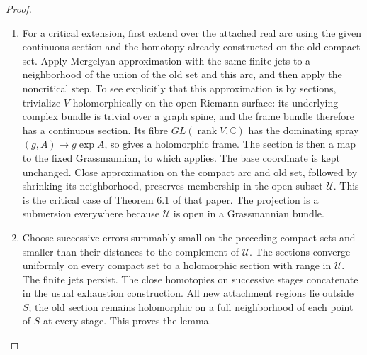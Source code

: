 \begin{proof}
\begin{enumerate}[label={$\langle1\rangle$\arabic*.}]
\item For a critical extension, first extend over the attached real
arc using the given continuous section and the homotopy already
constructed on the old compact set.  Apply Mergelyan
approximation with the same finite jets to a neighborhood of
the union of the old set and this arc, and then apply the
noncritical step.  To see explicitly that this approximation
is by sections, trivialize $V$ holomorphically on the open
Riemann surface: its underlying complex bundle is trivial over
a graph spine, and the frame bundle therefore has a continuous
section.  Its fibre $GL(\operatorname{rank}V,\mathbb C)$ has
the dominating spray $(g,A)\mapsto g\exp A$, so
\cite[Theorem 1.2, preprint p.~3]{ffForstnericPrezelj02} gives a holomorphic
frame.  The section is then a map to the
fixed Grassmannian, to which
\cite[Theorem 2.13, p.~9]{IVVOkaOneV5} applies.  The base
coordinate is kept unchanged.  Close approximation on the
compact arc and old set, followed by shrinking its
neighborhood, preserves membership in the open subset
$\mathscr U$.  This is the critical case of Theorem 6.1 of that paper. The
projection is a submersion everywhere because $\mathscr U$ is
open in a Grassmannian bundle.

\item Choose successive errors summably small on the preceding
compact sets and smaller than their distances to the complement
of $\mathscr U$.  The sections converge uniformly on every
compact set to a holomorphic section with range in
$\mathscr U$.  The finite jets persist.  The close homotopies
on successive stages concatenate in the usual exhaustion
construction.  All new attachment regions lie outside $S$;
the old section remains holomorphic on a full neighborhood of
each point of $S$ at every stage.  This proves the lemma.

\end{enumerate}
\end{proof}




